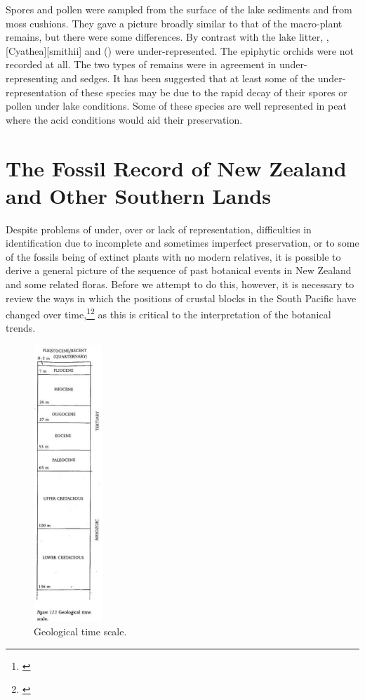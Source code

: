 Spores and pollen were sampled from the surface of the lake sediments and from moss cushions.
They gave a picture broadly similar to that of the macro-plant remains, but there were some differences.
By contrast with the lake litter, ,  [Cyathea][smithii] and  () were under-represented.
The epiphytic orchids were not recorded at all.
The two types of remains were in agreement in under-representing  and sedges.
It has been suggested that at least some of the under-representation of these species may be due to the rapid decay of their spores or pollen under lake conditions.
Some of these species are well represented in peat where the acid conditions would aid their preservation.

\section{The Fossil Record of New Zealand and Other Southern Lands}

Despite problems of under, over or lack of representation, difficulties in identification due to incomplete and sometimes imperfect preservation, or to some of the fossils being of extinct plants with no modern relatives, it is possible to derive a general picture of the sequence of past botanical events in New Zealand and some related floras.
Before we attempt to do this, however, it is necessary to review the ways in which the positions of crustal blocks in the South Pacific have changed over time,\footnote{\cite{kemp1978tertiary}}\footnote{\cite{crook1981break}} as this is critical to the interpretation of the botanical trends.
\begin{figure}
	\centering
	\includegraphics[width=0.23\textwidth]{graphics/figure123timescale.jpg}
	\caption[Geological time scale]{Geological time scale.}%
	\label{fig:123timescale}
\end{figure}

